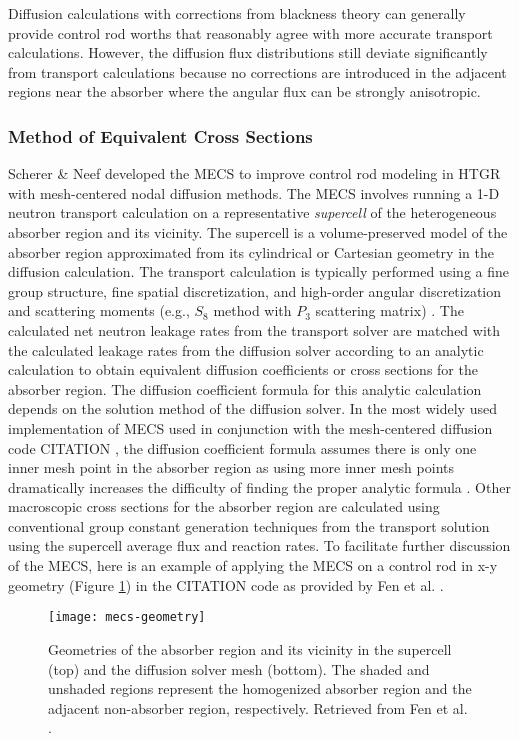 Diffusion calculations with corrections from blackness theory can generally provide control rod
worths that reasonably agree with more accurate transport calculations. However, the
diffusion flux distributions still deviate significantly from transport calculations because no
corrections are introduced in the adjacent regions near the absorber where the angular flux can be
strongly anisotropic.

\subsubsection{Method of Equivalent Cross Sections}

Scherer \& Neef developed the \gls{MECS} \cite{scherer_determination_1976} to improve control rod
modeling in \gls{HTGR} with mesh-centered nodal diffusion methods. The \gls{MECS} involves running
a 1-D neutron transport calculation on a representative \textit{supercell} of the heterogeneous
absorber region and its vicinity. The supercell is a volume-preserved model of the absorber region
approximated from its cylindrical or Cartesian geometry in the diffusion calculation. The transport
calculation is typically performed using a fine group structure, fine spatial discretization, and
high-order angular discretization and scattering moments (e.g., $S_8$ method with $P_3$ scattering
matrix) \cite{fen_modelling_1992}. The calculated net neutron leakage rates from the transport
solver are matched with the calculated leakage rates from the diffusion solver according to an
analytic calculation to obtain equivalent diffusion coefficients or cross sections for the absorber
region. The diffusion coefficient formula for this analytic calculation depends on the solution
method of the diffusion solver. In the most widely used implementation of \gls{MECS} used in
conjunction with the mesh-centered diffusion code CITATION \cite{teuchert_vsop94_1994}, the
diffusion coefficient formula assumes there is only one inner mesh point in the absorber region as
using more inner mesh points dramatically increases the difficulty of finding the proper analytic
formula \cite{fen_modelling_1992}. Other macroscopic cross sections for the absorber region are
calculated using conventional group constant generation techniques from the transport solution
using the supercell average flux and reaction rates. To facilitate further discussion of the
\gls{MECS}, here is an example of applying the \gls{MECS} on a control rod in x-y geometry (Figure
\ref{fig:mecs-geometry}) in the CITATION code as provided by Fen et al. \cite{fen_modelling_1992}.
%
\begin{figure}[htb]
    \centering
    \texttt{[image: mecs-geometry]}
    \caption{Geometries of the absorber region and its vicinity in the supercell
      (top) and the diffusion solver mesh (bottom).
        The shaded and unshaded regions represent the homogenized absorber
        region and the adjacent non-absorber region, respectively.
        Retrieved from Fen et al. \cite{fen_modelling_1992}.}
    \label{fig:mecs-geometry}
\end{figure}

